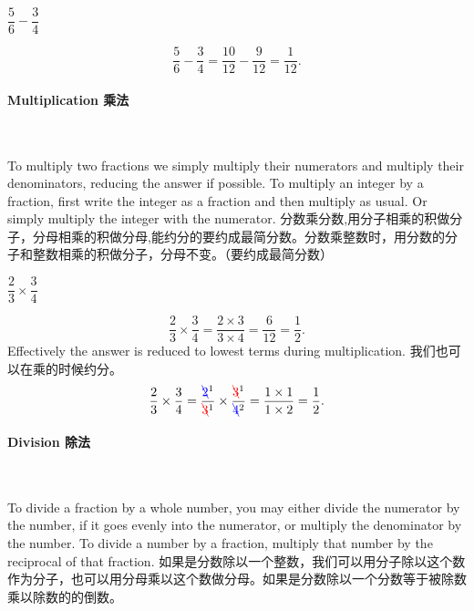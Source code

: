 \begin{example}
$
\dfrac{5}{6} - \dfrac{3}{4}
$
\end{example}
\begin{solution}
$$
\dfrac{5}{6} - \dfrac{3}{4} = \dfrac{10}{12} - \dfrac{9}{12} = \dfrac{1}{12}.
$$
\end{solution}

\paragraph{Multiplication 乘法} \ \ \\

\begin{paracol}{2}
To multiply two fractions we simply multiply their numerators and multiply their denominators, reducing the answer if possible. To multiply an integer by a fraction, first write the integer as a fraction and then multiply as usual. Or simply multiply the integer with the numerator. 
\switchcolumn[1]
分数乘分数,用分子相乘的积做分子，分母相乘的积做分母,能约分的要约成最简分数。分数乘整数时，用分数的分子和整数相乘的积做分子，分母不变。（要约成最简分数）
\end{paracol}

\begin{example}
$\dfrac{2}{3}\times \dfrac{3}{4}$
\end{example}
\begin{solution}
$$
\dfrac{2}{3}\times \dfrac{3}{4} = \dfrac{2\times 3}{3\times 4} = \dfrac{6}{12} = \dfrac{1}{2}.
$$
Effectively the answer is reduced to lowest terms during multiplication. 我们也可以在乘的时候约分。
$$
\dfrac{2}{3}\times \dfrac{3}{4} = \dfrac{{\color{blue}\bcancel{2}}^1}{{\color{red}\bcancel{3}}^1}\times \dfrac{{\color{red}\bcancel{3}}^1}{{\color{blue}\bcancel{4}}^2} = \dfrac{1\times 1}{1\times 2} = \dfrac{1}{2}.
$$

\end{solution}

\paragraph{Division 除法} \ \ \\

\begin{paracol}{2}
To divide a fraction by a whole number, you may either divide the numerator by the number, if it goes evenly into the numerator, or multiply the denominator by the number. To divide a number by a fraction, multiply that number by the reciprocal of that fraction.
\switchcolumn[1]
如果是分数除以一个整数，我们可以用分子除以这个数作为分子，也可以用分母乘以这个数做分母。如果是分数除以一个分数等于被除数乘以除数的的倒数。
\end{paracol}

